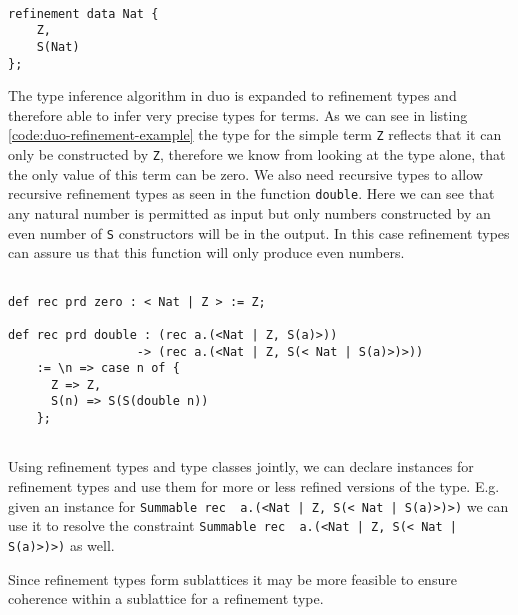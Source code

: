 \begin{lstlisting}[style=duostyle, label=code:duo-refinement-declaration, captionpos=b, caption={Refinement type of peano numbers in \emph{duo}}]

refinement data Nat {
    Z,
    S(Nat)
};

\end{lstlisting}

The type inference algorithm in duo is expanded to refinement types and therefore able to infer very precise types for terms. \cite{binder22refinement}
As we can see in listing \ref{code:duo-refinement-example} the type for the simple term \lstinline{Z} reflects that it can only be constructed by \lstinline{Z}, therefore we know from looking at the type alone, that the only value of this term can be zero.
We also need recursive types to allow recursive refinement types as seen in the function \lstinline{double}.
Here we can see that any natural number is permitted as input but only numbers constructed by an even number of \lstinline{S} constructors will be in the output.
In this case refinement types can assure us that this function will only produce even numbers.

\begin{lstlisting}[style=duostyle, label=code:duo-refinement-example, captionpos=b, caption={Type inference for refinement types in \emph{duo}}]

def rec prd zero : < Nat | Z > := Z;

def rec prd double : (rec a.(<Nat | Z, S(a)>))
                  -> (rec a.(<Nat | Z, S(< Nat | S(a)>)>))
    := \n => case n of {
      Z => Z,
      S(n) => S(S(double n))
    };
    
\end{lstlisting}

Using refinement types and type classes jointly, we can declare instances for refinement types and use them for more or less refined versions of the type.
E.g. given an instance for \lstinline{Summable rec  a.(<Nat | Z, S(< Nat | S(a)>)>)}  we can use it to resolve the constraint \lstinline{Summable rec  a.(<Nat | Z, S(< Nat | S(a)>)>)} as well.

Since refinement types form sublattices it may be more feasible to ensure coherence within a sublattice for a refinement type.